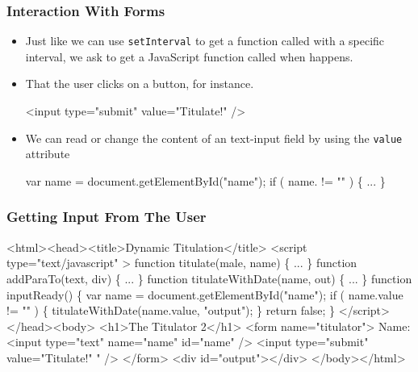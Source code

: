 \documentclass[svgnames,handout]{beamer}
\begin{document}
\begin{frame}[fragile=singleslide]
\frametitle{Interaction With Forms}

\begin{itemize}
\item Just like we can use \texttt{setInterval} to get a function
  called with a specific interval, we ask to get a JavaScript function
  called when  happens. 

\item That the user clicks on a button, for instance.
\begin{semiverbatim}
  <input type="submit" value="Titulate!" 
          />
\end{semiverbatim}

\item We can read or change the content of an text-input field by
  using the \texttt{value} attribute
\begin{semiverbatim}
  var name = document.getElementById("name");
  if ( name. != "" ) \{ ... \}
\end{semiverbatim}
\end{itemize}

\end{frame}



\begin{frame}[fragile]  
\frametitle{Getting Input From The User}
\begin{footnotesize}
\begin{semiverbatim}
<html><head><title>Dynamic Titulation</title>
<script type="text/javascript" >
function titulate(male, name) \{ ... \}
function addParaTo(text, div) \{ ... \}
function titulateWithDate(name, out) \{ ... \}
{function inputReady() \{
  var name = document.getElementById("name");
  if ( name.value != "" ) \{ titulateWithDate(name.value, "output"); \}
  return false;
\}}
</script></head><body>
  <h1>The Titulator 2</h1>
  <form name="titulator">
  Name: <input type="text" name="name" id="name" />
  <input type="submit" value="Titulate!" 
         " /> 
  </form> 
  <div id="output"></div>
</body></html>
\end{semiverbatim}
\end{footnotesize}
\end{frame}
\end{document}
